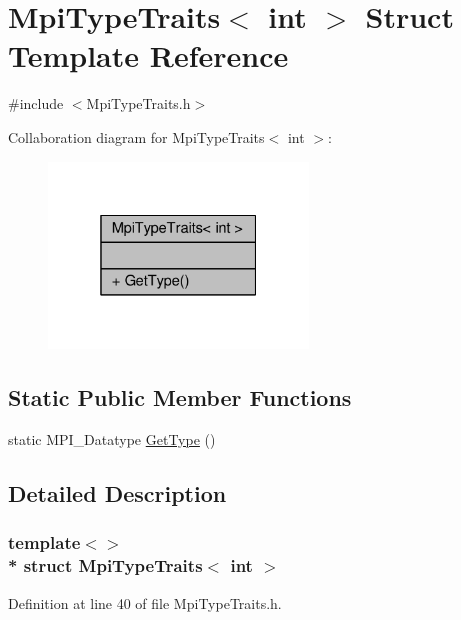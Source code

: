 \hypertarget{structMpiTypeTraits_3_01int_01_4}{}\section{Mpi\+Type\+Traits$<$ int $>$ Struct Template Reference}
\label{structMpiTypeTraits_3_01int_01_4}


{\ttfamily \#include $<$Mpi\+Type\+Traits.\+h$>$}



Collaboration diagram for Mpi\+Type\+Traits$<$ int $>$\+:
\nopagebreak
\begin{figure}[H]
\begin{center}
\leavevmode
\includegraphics[width=196pt]{structMpiTypeTraits_3_01int_01_4__coll__graph}
\end{center}
\end{figure}
\subsection*{Static Public Member Functions}
\begin{DoxyCompactItemize}
\item 
static M\+P\+I\+\_\+\+Datatype \hyperlink{structMpiTypeTraits_3_01int_01_4_a36b29854d4feaa2fa60989891cc4831d}{Get\+Type} ()
\end{DoxyCompactItemize}


\subsection{Detailed Description}
\subsubsection*{template$<$$>$\\*
struct Mpi\+Type\+Traits$<$ int $>$}



Definition at line 40 of file Mpi\+Type\+Traits.\+h.



